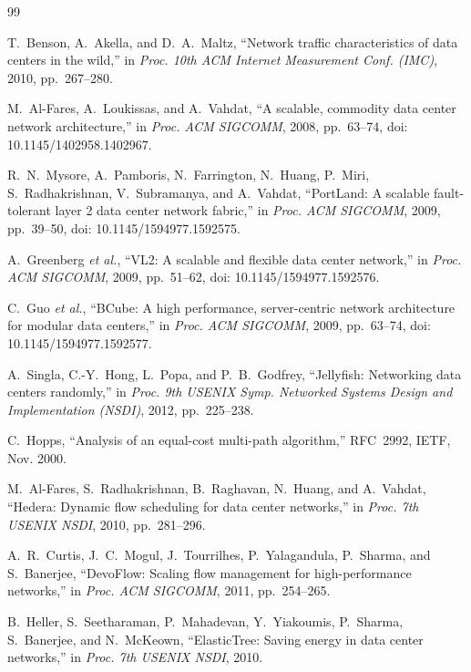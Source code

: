 \documentclass[conference]{IEEEtran}
\begin{document}
\begin{thebibliography}{99}

T.~Benson, A.~Akella, and D.~A.~Maltz, ``Network traffic characteristics of data centers in the wild,'' in \emph{Proc. 10th ACM Internet Measurement Conf. (IMC)}, 2010, pp.~267--280.

M.~Al-Fares, A.~Loukissas, and A.~Vahdat, ``A scalable, commodity data center network architecture,'' in \emph{Proc. ACM SIGCOMM}, 2008, pp.~63--74, doi: 10.1145/1402958.1402967.

R.~N.~Mysore, A.~Pamboris, N.~Farrington, N.~Huang, P.~Miri, S.~Radhakrishnan, V.~Subramanya, and A.~Vahdat, ``PortLand: A scalable fault-tolerant layer 2 data center network fabric,'' in \emph{Proc. ACM SIGCOMM}, 2009, pp.~39--50, doi: 10.1145/1594977.1592575.

A.~Greenberg \emph{et al.}, ``VL2: A scalable and flexible data center network,'' in \emph{Proc. ACM SIGCOMM}, 2009, pp.~51--62, doi: 10.1145/1594977.1592576.

C.~Guo \emph{et al.}, ``BCube: A high performance, server-centric network architecture for modular data centers,'' in \emph{Proc. ACM SIGCOMM}, 2009, pp.~63--74, doi: 10.1145/1594977.1592577.

A.~Singla, C.-Y.~Hong, L.~Popa, and P.~B.~Godfrey, ``Jellyfish: Networking data centers randomly,'' in \emph{Proc. 9th USENIX Symp. Networked Systems Design and Implementation (NSDI)}, 2012, pp.~225--238.

C.~Hopps, ``Analysis of an equal-cost multi-path algorithm,'' RFC~2992, IETF, Nov. 2000.

M.~Al-Fares, S.~Radhakrishnan, B.~Raghavan, N.~Huang, and A.~Vahdat, ``Hedera: Dynamic flow scheduling for data center networks,'' in \emph{Proc. 7th USENIX NSDI}, 2010, pp.~281--296.

A.~R.~Curtis, J.~C.~Mogul, J.~Tourrilhes, P.~Yalagandula, P.~Sharma, and S.~Banerjee, ``DevoFlow: Scaling flow management for high-performance networks,'' in \emph{Proc. ACM SIGCOMM}, 2011, pp.~254--265.

B.~Heller, S.~Seetharaman, P.~Mahadevan, Y.~Yiakoumis, P.~Sharma, S.~Banerjee, and N.~McKeown, ``ElasticTree: Saving energy in data center networks,'' in \emph{Proc. 7th USENIX NSDI}, 2010.


\end{thebibliography}
\end{document}

